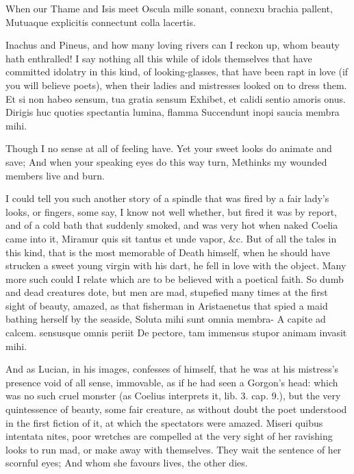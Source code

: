 {When our Thame and Isis meet
Oscula mille sonant, connexu brachia pallent,
Mutuaque explicitis connectunt colla lacertis.

Inachus and Pineus, and how many loving rivers can I reckon up, whom
beauty hath enthralled! I say nothing all this while of idols
themselves that have committed idolatry in this kind, of
looking-glasses, that have been rapt in love (if you will believe
poets), when their ladies and mistresses looked on to dress them.
Et si non habeo sensum, tua gratia sensum
Exhibet, et calidi sentio amoris onus.
Dirigis huc quoties spectantia lumina, flamma
Succendunt inopi saucia membra mihi.

Though I no sense at all of feeling have.
Yet your sweet looks do animate and save;
And when your speaking eyes do this way turn,
Methinks my wounded members live and burn.

I could tell you such another story of a spindle that was fired by a
fair lady's looks, or fingers, some say, I know not well whether,
but fired it was by report, and of a cold bath that suddenly smoked,
and was very hot when naked Coelia came into it, Miramur quis sit
tantus et unde vapor, \&c. But of all the tales in this kind, that
is the most memorable of Death himself, when he should have
strucken a sweet young virgin with his dart, he fell in love with the
object. Many more such could I relate which are to be believed with a
poetical faith. So dumb and dead creatures dote, but men are mad,
stupefied many times at the first sight of beauty, amazed, as
that fisherman in Aristaenetus that spied a maid bathing herself by the
seaside,
Soluta mihi sunt omnia membra-
A capite ad calcem. sensusque omnis periit
De pectore, tam immensus stupor animam invasit mihi.

And as Lucian, in his images, confesses of himself, that he was
at his mistress's presence void of all sense, immovable, as if he had
seen a Gorgon's head: which was no such cruel monster (as Coelius
interprets it, lib. 3. cap. 9.), but the very quintessence of beauty,
some fair creature, as without doubt the poet understood in the first
fiction of it, at which the spectators were amazed. Miseri quibus
intentata nites, poor wretches are compelled at the very sight of her
ravishing looks to run mad, or make away with themselves.
They wait the sentence of her scornful eyes;
And whom she favours lives, the other dies.

}
